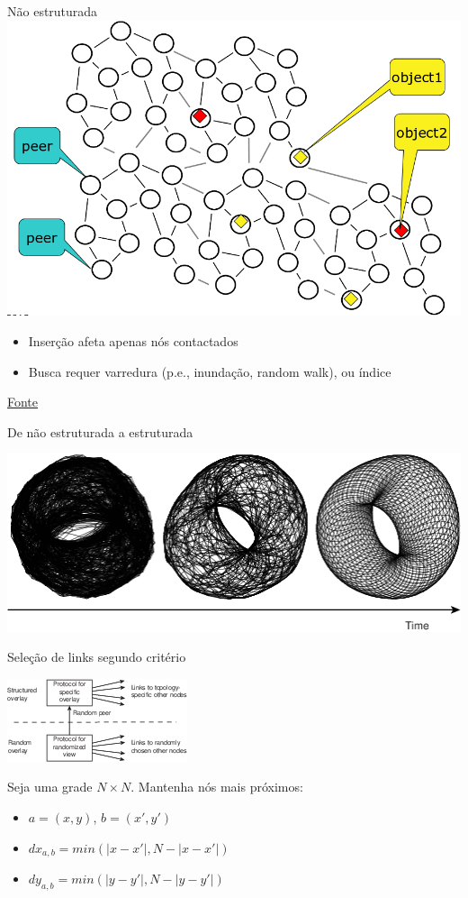 \begin{frame}{Não estruturada}
\includegraphics[width=.6\textwidth]{images/unstructured}	

\begin{itemize}
	\item Inserção afeta apenas nós contactados
	\item Busca requer varredura (p.e., inundação, random walk), ou índice
\end{itemize}


\href{http://gossple2.irisa.fr/~akermarr/LSDS-EPFL-unstructured.pdf}{Fonte}
\end{frame}


\begin{frame}{De não estruturada a estruturada}

\includegraphics[width=.6\textwidth]{images/02-11}	

\pause

Seleção de links segundo critério

\includegraphics[width=.6\textwidth]{images/02-10}	

\pause
Seja uma grade $N \times N$. Mantenha nós mais próximos:
\begin{itemize}
	\item $a = (x,y)$, $b = (x', y')$
	\item $dx_{a,b} = min(|x - x'|, N - |x - x'|)$
	\item $dy_{a,b} = min(|y - y'|, N - |y - y'|)$
	
\end{itemize}
\end{frame}

